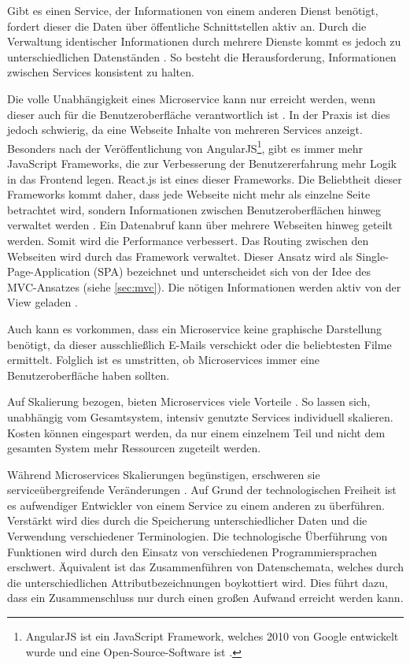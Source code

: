Gibt es einen Service, der Informationen von einem anderen Dienst benötigt, fordert dieser die Daten über öffentliche Schnittstellen aktiv an. Durch die Verwaltung identischer Informationen durch mehrere Dienste kommt es jedoch zu unterschiedlichen Datenständen \parencite[vgl.][Kap. 4.1]{wolff_microservices_2018}. So besteht die Herausforderung, Informationen zwischen Services konsistent zu halten.

Die volle Unabhängigkeit eines Microservice kann nur erreicht werden, wenn dieser auch für die Benutzeroberfläche verantwortlich ist \parencite[vgl.][Kap. 4.4]{wolff_microservices_2018}. In der Praxis ist dies jedoch schwierig, da eine Webseite Inhalte von mehreren Services anzeigt. Besonders nach der Veröffentlichung von AngularJS\footnote{AngularJS ist ein JavaScript Framework, welches 2010 von Google entwickelt wurde und eine Open-Source-Software ist \parencite{angularjs}.}, gibt es immer mehr JavaScript Frameworks, die zur Verbesserung der Benutzererfahrung mehr Logik in das Frontend legen. React.js ist eines dieser Frameworks.
Die Beliebtheit dieser Frameworks kommt daher, dass jede Webseite nicht mehr als einzelne Seite betrachtet wird, sondern Informationen zwischen Benutzeroberflächen hinweg verwaltet werden \parencite[vgl.][Kap. 9.1]{wolff_microservices_2018}. Ein Datenabruf kann über mehrere Webseiten hinweg geteilt werden. Somit wird die Performance verbessert. Das Routing zwischen den Webseiten wird durch das Framework verwaltet. Dieser Ansatz wird als Single-Page-Application (SPA) bezeichnet und unterscheidet sich von der Idee des MVC-Ansatzes (siehe \cref{sec:mvc}). Die nötigen Informationen werden aktiv von der View geladen \parencite{single-page-webanwendung_2019}.

Auch kann es vorkommen, dass ein Microservice keine graphische Darstellung benötigt, da dieser ausschließlich E-Mails verschickt oder die beliebtesten Filme ermittelt. Folglich ist es umstritten, ob Microservices immer eine Benutzeroberfläche haben sollten.

Auf Skalierung bezogen, bieten Microservices viele Vorteile \parencite[vgl.][Kap. 2.1.4]{newman_monolith_2019}. So lassen sich, unabhängig vom Gesamtsystem, intensiv genutzte Services individuell skalieren. Kosten können eingespart werden, da nur einem einzelnem Teil und nicht dem gesamten System mehr Ressourcen zugeteilt werden.

Während Microservices Skalierungen begünstigen, erschweren sie serviceübergreifende Veränderungen \parencite[vgl.][Kap. 2.15]{newman_monolith_2019}. Auf Grund der technologischen Freiheit ist es aufwendiger Entwickler von einem Service zu einem anderen zu überführen. Verstärkt wird dies durch die Speicherung unterschiedlicher Daten und die Verwendung verschiedener Terminologien. Die technologische Überführung von Funktionen wird durch den Einsatz von verschiedenen Programmiersprachen erschwert. Äquivalent ist das Zusammenführen von Datenschemata, welches durch die unterschiedlichen Attributbezeichnungen boykottiert wird. Dies führt dazu, dass ein Zusammenschluss nur durch einen großen Aufwand erreicht werden kann.

